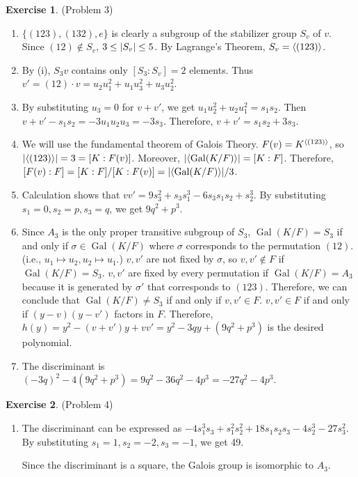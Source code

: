 \documentclass[12pt, psamsfonts]{amsart}
\theoremstyle{definition}
\newtheorem*{exer}{Exercise}
\theoremstyle{remark}
\DeclareMathOperator{\Gal}{Gal}
\numberwithin{equation}{section}
\begin{document}
\begin{exer}{(Problem 3)}
  \begin{enumerate}[label=(\alph*)]
    \item
      $\{ (123), (132), e \}$ is clearly a subgroup of the stabilizer group $S_v$ of $v$.
      Since $(12) \notin S_v$, $3 \leq \abs{S_v} \leq 5$.
      By Lagrange's Theorem, $S_v = \ev{(123)}$. 
    \item
      By (i), $S_3v$ contains only $[S_3:S_v] = 2$ elements.
      Thus $v' = (12) \cdot v = u_2u_1^2 + u_1u_3^2 + u_3u_2^2$.
    \item
      By substituting $u_3 = 0$ for $v + v'$, we get $u_1u_2^2 + u_2u_1^2 = s_1s_2$.
      Then $v + v' - s_1s_2 = -3u_1u_2u_3 = -3s_3$.
      Therefore, $v + v' = s_1s_2 + 3s_3$.
    \item
      We will use the fundamental theorem of Galois Theory.
      $F(v) = K^{\ev{(123)}}$, so $\abs{\ev{(123)}} = 3 = [K:F(v)]$.
      Moreover, $\abs{\ev{\Gal(K/F)}} = [K:F]$.
      Therefore, $[F(v):F] = [K:F]/[K:F(v)] = \abs{\ev{\Gal(K/F)}}/3$.
    \item
      Calculation shows that $vv' = 9s_3^2 + s_3s_1^3 - 6s_3s_1s_2 + s_2^3$.
      By substituting $s_1 = 0, s_2 = p, s_3 = q$, we get $9q^2 + p^3$.
    \item
      Since $A_3$ is the only proper transitive subgroup of $S_3$, $\Gal(K/F) = S_3$ if and only if $\sigma \in \Gal(K/F)$ where $\sigma$ corresponds to the permutation $(12)$.
      (i.e., $u_1 \mapsto u_2, u_2 \mapsto u_1$.)
      $v, v'$ are not fixed by $\sigma$, so $v, v' \notin F$ if $\Gal(K/F) = S_3$.
      $v, v'$ are fixed by every permutation if $\Gal(K/F) = A_3$ because it is generated by $\sigma'$ that corresponds to $(123)$.
      Therefore, we can conclude that $\Gal(K/F) \ne S_3$ if and only if $v, v' \in F$.
      $v, v' \in F$ if and only if $(y - v)(y - v')$ factors in $F$.
      Therefore, $h(y) = y^2 - (v + v')y + vv' = y^2 - 3qy + (9q^2 + p^3)$ is the desired polynomial.
    \item
      The discriminant is $(-3q)^2 - 4(9q^2 + p^3) = 9q^2 - 36q^2 - 4p^3 = -27q^2 - 4p^3$.
  \end{enumerate}
\end{exer}

\begin{exer}{(Problem 4)}
  \begin{enumerate}[label=(\alph*)]
    \item 
      The discriminant can be expressed as $-4s_{1}^{3}s_{3}+s_{1}^{2}s_{2}^{2}+18s_{1}s_{2}s_{3}-4s_{2}^{3}-27s_{3}^{2}$.
      By substituting $s_1 = 1, s_2 = -2, s_3 = -1$, we get 49.
      
      Since the discriminant is a square, the Galois group is isomorphic to $A_3$.

  \end{enumerate}
\end{exer}
\end{document}
